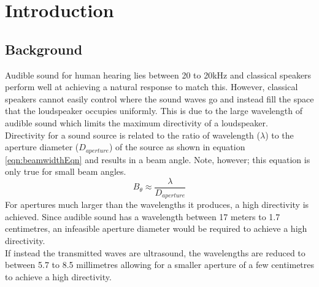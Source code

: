 \section{Introduction}
\subsection{Background}
Audible sound for human hearing lies between 20 to 20kHz and classical speakers perform well at achieving a natural response to match this. However, classical speakers cannot easily control where the sound waves go and instead fill the space that the loudspeaker occupies uniformly. This is due to the large wavelength of audible sound which limits the maximum directivity of a loudspeaker.\\
Directivity for a sound source is related to the ratio of wavelength ($\lambda$) to the aperture diameter ($D_{aperture}$) of the source as shown in equation \ref{eqn:beamwidthEqn} and results in a beam angle. Note, however; this equation is only true for small beam angles.
\begin{equation}
    B_\theta \approx \frac{\lambda}{D_{aperture}}
    \label{eqn:beamwidthEqn}
\end{equation}
For apertures much larger than the wavelengths it produces, a high directivity is achieved. Since audible sound has a wavelength between 17 meters to 1.7 centimetres, an infeasible aperture diameter would be required to achieve a high directivity.\\
If instead the transmitted waves are ultrasound, the wavelengths are reduced to between 5.7 to 8.5 millimetres allowing for a smaller aperture of a few centimetres to achieve a high directivity.
